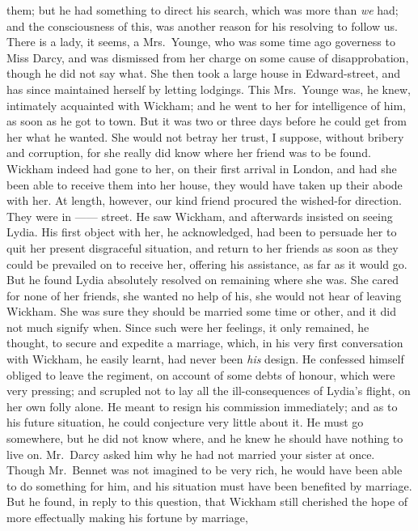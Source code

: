 \begin{letter}
them; but he had something to direct his search, which
was more than \textit{we} had; and the consciousness of this,
was another reason for his resolving to follow us. There
is a lady, it seems, a Mrs.\ Younge, who was some
time ago governess to Miss Darcy, and was dismissed
from her charge on some cause of disapprobation, though
he did not say what. She then took a large house in
Edward-street, and has since maintained herself by letting
lodgings. This Mrs.\ Younge was, he knew, intimately
acquainted with Wickham; and he went to her for intelligence
of him, as soon as he got to town. But it was
two or three days before he could get from her what he
wanted. She would not betray her trust, I suppose,
without bribery and corruption, for she really did know
where her friend was to be found. Wickham indeed had
gone to her, on their first arrival in London, and had she
been able to receive them into her house, they would
have taken up their abode with her. At length, however,
our kind friend procured the wished-for direction. They
were in ------ street. He saw Wickham, and afterwards
insisted on seeing Lydia. His first object with her, he
acknowledged, had been to persuade her to quit her
present disgraceful situation, and return to her friends as
soon as they could be prevailed on to receive her, offering
his assistance, as far as it would go. But he found Lydia
absolutely resolved on remaining where she was. She
cared for none of her friends, she wanted no help of his,
she would not hear of leaving Wickham. She was sure
they should be married some time or other, and it did
not much signify when. Since such were her feelings,
it only remained, he thought, to secure and expedite
a marriage, which, in his very first conversation with
Wickham, he easily learnt, had never been \textit{his} design.
He confessed himself obliged to leave the regiment, on
account of some debts of honour, which were very pressing;
and scrupled not to lay all the ill-consequences of Lydia’s
flight, on her own folly alone. He meant to resign his
commission immediately; and as to his future situation,
he could conjecture very little about it. He must go
somewhere, but he did not know where, and he knew he
should have nothing to live on. Mr.\ Darcy asked him
why he had not married your sister at once. Though
Mr.\ Bennet was not imagined to be very rich, he would
have been able to do something for him, and his situation
must have been benefited by marriage. But he found,
in reply to this question, that Wickham still cherished
the hope of more effectually making his fortune by marriage,

\end{letter}

